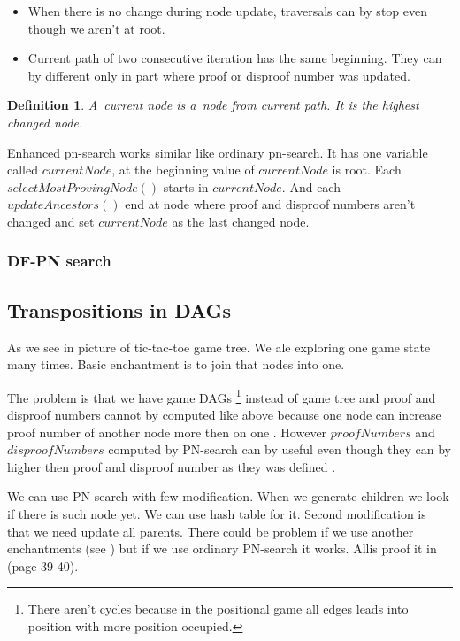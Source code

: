 \begin{itemize}
\item When there is no change during node update, traversals can by stop even though we
aren't at root.
\item Current path of two consecutive iteration has the same beginning. They can by different 
only in part where proof or disproof number was updated.
\end{itemize}

\newtheorem*{currentNode}{Definition}	
\begin{currentNode}
A~{\sl current node} is a~node from current path. It is the highest changed node.
\end{currentNode}


Enhanced pn-search works similar like ordinary pn-search. It has one variable
called $currentNode$, at the beginning value of $currentNode$ is root. Each
$selectMostProvingNode()$ starts in $currentNode$. And each $updateAncestors()$
end at node where proof and disproof numbers aren't changed and set
$currentNode$ as the last changed node.

\subsubsection{DF-PN search}


\subsection{Transpositions in DAGs}

As we see in picture  of tic-tac-toe game tree.  We ale exploring one
game state many times. Basic enchantment is to join that nodes into one.

The problem is that we have game DAGs \footnote{There aren't cycles because in the
positional game all edges leads into position with more position occupied.}
instead of game tree and proof and disproof numbers
cannot by computed like above because one node can increase proof number of
another node more then on one . However $proofNumbers$ and $disproofNumbers$
computed by PN-search can by useful even though they can by higher then proof
and disproof number as they was defined . 

We can use PN-search with few modification. When we generate children we look
if there is such node yet. We can use hash table for it. Second modification is
that we need update all parents. There could be problem if we use another
enchantments (see ) but if we use ordinary PN-search it works. Allis
proof it in \cite{allis} (page 39-40).

